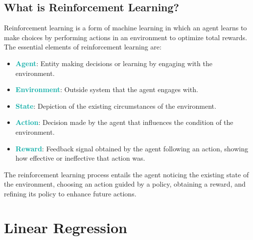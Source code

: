 \documentclass[twoside]{article}
\newcommand{\highlightbluetext}[1]{\textcolor[HTML]{09ACA6}{\textbf{#1}}}
\numberwithin{equation}{section}
\begin{document}
	\subsection{What is Reinforcement Learning?}
	\label{subsec:WhatIsReinforcementLearning}
	Reinforcement learning is a form of machine learning in which an agent learns to make choices by performing actions in an environment to optimize total rewards. The essential elements of reinforcement learning are: 
	\begin{itemize}
		\item \highlightbluetext{Agent}: Entity making decisions or learning by engaging with the environment. 
		\item \highlightbluetext{Environment}: Outside system that the agent engages with. 
		\item \highlightbluetext{State}: Depiction of the existing circumstances of the environment. 
		\item \highlightbluetext{Action}: Decision made by the agent that influences the condition of the environment. 
		\item \highlightbluetext{Reward}: Feedback signal obtained by the agent following an action, showing how effective or ineffective that action was. 
	\end{itemize} 
	The reinforcement learning process entails the agent noticing the existing state of the environment, choosing an action guided by a policy, obtaining a reward, and refining its policy to enhance future actions.

	\begin{center}
	\end{center}

	\newpage
	\section{Linear Regression}
	\label{sec:LinearRegression}
\end{document}
